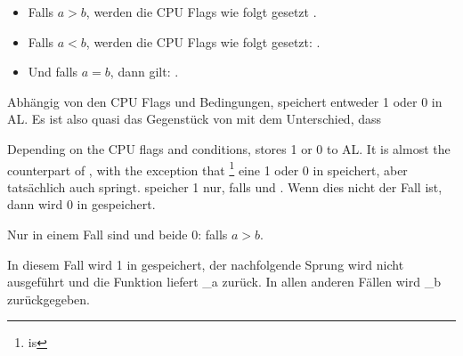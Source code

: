 \begin{itemize}
\item Falls $a>b$, werden die CPU Flags wie folgt gesetzt .
\item Falls $a<b$, werden die CPU Flags wie folgt gesetzt: .
\item Und falls $a=b$, dann gilt: .
\end{itemize}

Abhängig von den CPU Flags und Bedingungen, speichert \SETNBE entweder 1 oder 0
in AL.
Es ist also quasi das Gegenstück von \JNBE mit dem Unterschied, dass \SETcc

Depending on the CPU flags and conditions, \SETNBE stores 1 or 0 to AL. 
It is almost the counterpart of \JNBE, with the exception that \SETcc
\footnote{ is } eine 1 oder 0 in \AL speichert, aber
\Jcc tatsächlich auch springt.
\SETNBE speicher 1 nur, falls  und .
Wenn dies nicht der Fall ist, dann wird 0 in \AL gespeichert.

Nur in einem Fall sind \CF und \ZF beide 0: falls $a>b$.

In diesem Fall wird 1 in \AL gespeichert, der nachfolgende \JZ Sprung wird nicht
ausgeführt und die Funktion liefert {\_a} zurück. In allen anderen Fällen wird
{\_b} zurückgegeben.
